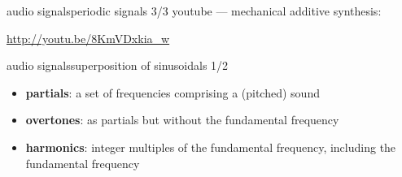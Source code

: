 \begin{frame}{audio signals}{periodic signals 3/3}
    youtube --- mechanical additive synthesis:
    
    \url{http://youtu.be/8KmVDxkia_w}
    
\end{frame}


\begin{frame}{audio signals}{superposition of sinusoidals 1/2}
    \begin{itemize}
        \item   \textbf{partials}: a set of frequencies comprising a (pitched) sound
        \item   \textbf{overtones}: as partials but without the fundamental frequency
        \item   \textbf{harmonics}: integer multiples of the fundamental frequency, including the fundamental frequency
    \end{itemize}
    
\end{frame}

